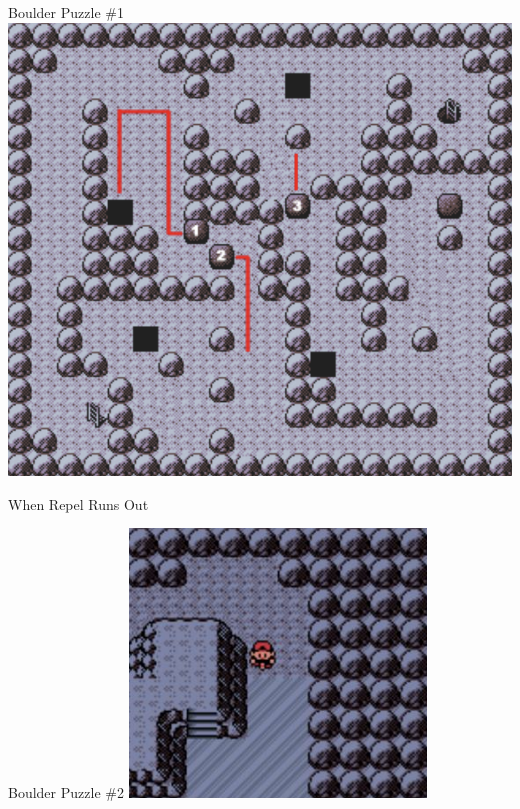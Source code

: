 \begin{paracol}{2}
\begin{story}{Boulder Puzzle \#1}
	\varwb
	\includegraphics[scale=0.65]{../Graphics/14. Boulder Puzzle 1.png}
	\varwe
\end{story}

\switchcolumn
\begin{menu}{When Repel Runs Out}
	\varwb
	\begin{packMenu}
		\item \superRepel
	\end{packMenu}
	\begin{pokeMenu}
		\item {} \strength
	\end{pokeMenu}
	\varwe
\end{menu}

\begin{story}{Boulder Puzzle \#2}
	\varwb
	\includegraphics{../Graphics/15. Boulder Puzzle 2.png}
	\varwe
\end{story}


\end{paracol}

